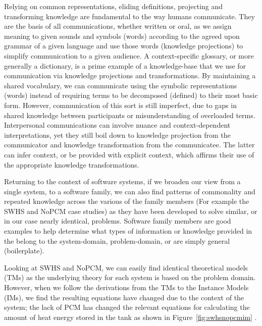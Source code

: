 Relying on common representations, eliding definitions, projecting and 
transforming knowledge are fundamental to the way humans communicate. They are 
the basis of all communications, whether written or oral, as we assign meaning 
to given sounds and symbols (words) according to the agreed upon grammar of a 
given language and use those words (knowledge projections) to simplify 
communication to a given audience. A context-specific glossary, or more 
generally a dictionary, is a prime example of a knowledge-base that we use for 
communication via knowledge projections and transformations. By maintaining a 
shared vocabulary, we can communicate using the symbolic representations 
(words) instead of requiring terms to be decomposed (defined) to their most 
basic form. However, communication of this sort is still imperfect, due to gaps 
in shared knowledge between participants or misunderstanding of overloaded 
terms. Interpersonal communications can involve nuance and context-dependent 
interpretations, yet they still boil down to knowledge projection from the 
communicator and knowledge transformation from the communicatee. The latter can 
infer context, or be provided with explicit context, which affirms their use of 
the appropriate knowledge transformations.

Returning to the context of software systems, if we broaden our view from a 
single system, to a software family, we can also find patterns of commonality 
and repeated knowledge across the various \sfs{} of the family members (For 
example the SWHS and NoPCM case studies) as they have been developed to solve 
similar, or in our case nearly identical, problems. Software family members are 
good examples to help determine what types of information or knowledge provided 
in the \sfs{} belong to the system-domain, problem-domain, or are simply 
general (boilerplate).

Looking at SWHS and NoPCM, we can easily find identical theoretical models 
(TMs)  as the 
underlying theory for each system is based on the problem domain.
However, when we follow the derivations from the TMs to the Instance Models 
(IMs), we find the resulting equations have changed due to the context of the 
system; the lack of PCM has changed the relevant equations for calculating the 
amount of heat energy stored in the tank as shown in 
Figure~\ref{fig:swhsnopcmim} .

